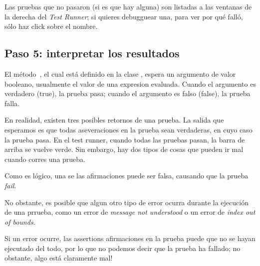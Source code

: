 \documentclass[a4paper,10pt,twoside]{book}
\begin{document}


Las pruebas que no pasaron (si es que hay alguna) son listadas a las ventanas de la derecha del \emph{Test Runner};
si quieres debugguear una, para ver por qu\'e fall\'o, s\'olo haz click sobre el nombre.


\subsection{Paso 5: interpretar los resultados}

El m\'etodo \,, el cual est\'a definido en la clase
, espera un argumento de valor booleano, usualmente el valor de 
una expresion evaluada. Cuando el argumento es verdadero (true), la prueba pasa;
cuando el argumento es falso (false), la prueba falla.

En realidad, existen tres posibles retornos de una prueba.
La salida que esperamos es que todas aseveraciones en la prueba sean verdaderas, en cuyo caso la prueba pasa.
En el test runner, cuando todas las pruebas pasan, la barra de arriba se vuelve verde.
Sin embargo, hay dos tipos de cosas que pueden ir mal cuando corres una prueba.

Como es l\'ogico, una se las afirmaciones puede ser falsa, causando que la prueba \emph{fail}. 

No obstante, es posible que algun otro tipo de error ocurra durante la ejecuci\'on de una prrueba,
como un error de \emph{message not understood} o un error de \emph{index out of bounds}.

Si un error ocurre, las assertions afirmaciones en la prueba puede que no se hayan ejecutado del todo, 
por lo que no podemos decir que la prueba ha fallado; no obstante, algo est\'a claramente mal!
\end{document}
